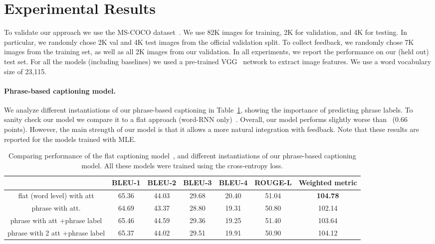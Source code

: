 \vspace{-2mm}
\section{Experimental Results}
\label{sec:results}
\vspace{-1mm}

To validate our approach we use the MS-COCO dataset~\cite{lin2014microsoft}. We use 82K images for training, 2K for validation, and 4K for testing. In particular, we randomly 
chose 2K val and 4K test images from the official validation split. To collect feedback, we randomly chose 7K images from the training set, as well as all 2K images from our validation. In all experiments, we report the performance on our (held out) test set. 
For all the models (including baselines) we used a pre-trained VGG~\cite{vgg} network to extract image features. We use a word vocabulary size of 23,115. 

\vspace{-2mm}
\paragraph{Phrase-based captioning model.} We analyze different instantiations of our phrase-based captioning in Table~\ref{MLE-table}, showing the importance of predicting phrase labels. To sanity check our model we compare it to a flat approach (word-RNN only)~\cite{Xu15}. %
Overall, our model performs slightly worse than~\cite{Xu15} ($0.66$ points). However, the main strength of our model is that it allows a more natural integration with feedback. Note that these results are reported for the models trained with MLE.

\begin{table}[t!]
\vspace{-1mm}
\small
  \centering
   \addtolength{\tabcolsep}{-1.6pt}
  \begin{tabular}{c|cccccc}
    \toprule
     & BLEU-1 & BLEU-2 & BLEU-3 & BLEU-4 & ROUGE-L& Weighted metric   \\
     \hline
    flat (word level) with att &65.36 & 44.03 & 29.68 & 20.40 & 51.04& {\bf 104.78}\\
    \hline
    phrase with att. &64.69 & 43.37 & 28.80 & 19.31 & 50.80& 102.14\\
    phrase with att +phrase label &65.46 & 44.59 & 29.36 & 19.25& 51.40& 103.64\\
    phrase with 2 att +phrase label &65.37 & 44.02 & 29.51 & 19.91 & 50.90& 104.12 \\
    \bottomrule
  \end{tabular}
    \caption{\small Comparing performance of the flat captioning model~\cite{Xu15}, and different instantiations of our phrase-based captioning model. All these models were trained using the cross-entropy loss.}
  \label{MLE-table}
  \vspace{-2mm}
\end{table}



